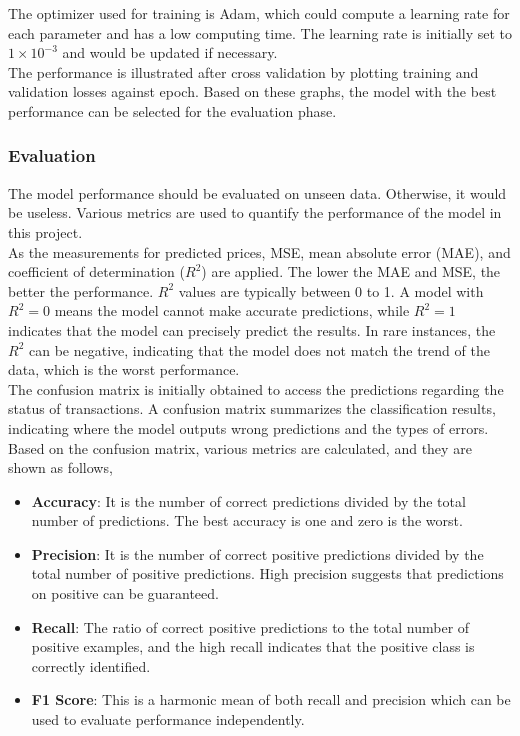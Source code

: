 \documentclass[12pt,twoside]{report}
\begin{document}
The optimizer used for training is Adam, which could compute a learning rate for each parameter and has a low computing time. The learning rate is initially set to $1 \times 10^{-3}$ and would be updated if necessary.
\\

The performance is illustrated after cross validation by plotting training and validation losses against epoch. Based on these graphs, the model with the best performance can be selected for the evaluation phase. 

\subsubsection{Evaluation}
The model performance should be evaluated on unseen data. Otherwise, it would be useless. Various metrics are used to quantify the performance of the model in this project. 
\\

As the measurements for predicted prices, MSE, mean absolute error (MAE), and coefficient of determination ($R^2$) are applied.  The lower the MAE and MSE, the better the performance. $R^2$ values are typically between 0 to 1. A model with $R^2 = 0$ means the model cannot make accurate predictions, while $R^2 = 1$ indicates that the model can precisely predict the results. In rare instances, the $R^2$ can be negative, indicating that the model does not match the trend of the data, which is the worst performance. 
\\

The confusion matrix is initially obtained to access the predictions regarding the status of transactions. A confusion matrix summarizes the classification results, indicating where the model outputs wrong predictions and the types of errors. Based on the confusion matrix, various metrics are calculated, and they are shown as follows, 
\begin{itemize}
	\item \textbf{Accuracy}: It is the number of correct predictions divided by the total number of predictions. The best accuracy is one and zero is the worst. 
	\item \textbf{Precision}: It is the number of correct positive predictions divided by the total number of positive predictions. High precision suggests that predictions on positive can be guaranteed.
	\item \textbf{Recall}: The ratio of correct positive predictions to the total number of positive examples, and the high recall indicates that the positive class is correctly identified. 
	\item \textbf{F1 Score}: This is a harmonic mean of both recall and precision which can be used to evaluate performance independently. 
\end{itemize}
\end{document}
